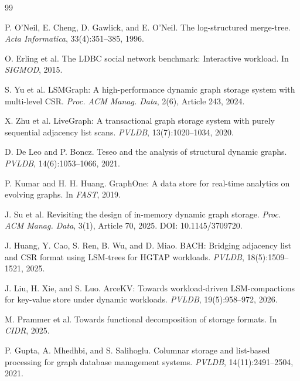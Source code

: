\documentclass[sigconf,screen]{cidr-2027}
\begin{document}
\begin{thebibliography}{99}

P. O'Neil, E. Cheng, D. Gawlick, and E. O'Neil.
\newblock The log-structured merge-tree.
\newblock \emph{Acta Informatica}, 33(4):351--385, 1996.

O. Erling et al.
\newblock The LDBC social network benchmark: Interactive workload.
\newblock In \emph{SIGMOD}, 2015.

S. Yu et al.
\newblock LSMGraph: A high-performance dynamic graph storage system with
multi-level CSR.
\newblock \emph{Proc. ACM Manag. Data}, 2(6), Article 243, 2024.

X. Zhu et al.
\newblock LiveGraph: A transactional graph storage system with purely
sequential adjacency list scans.
\newblock \emph{PVLDB}, 13(7):1020--1034, 2020.

D. De Leo and P. Boncz.
\newblock Teseo and the analysis of structural dynamic graphs.
\newblock \emph{PVLDB}, 14(6):1053--1066, 2021.

P. Kumar and H. H. Huang.
\newblock GraphOne: A data store for real-time analytics on evolving graphs.
\newblock In \emph{FAST}, 2019.

J. Su et al.
\newblock Revisiting the design of in-memory dynamic graph storage.
\newblock \emph{Proc. ACM Manag. Data}, 3(1), Article 70, 2025.
\newblock DOI: 10.1145/3709720.

J. Huang, Y. Cao, S. Ren, B. Wu, and D. Miao.
\newblock BACH: Bridging adjacency list and CSR format using LSM-trees for
HGTAP workloads.
\newblock \emph{PVLDB}, 18(5):1509--1521, 2025.

J. Liu, H. Xie, and S. Luo.
\newblock ArceKV: Towards workload-driven LSM-compactions for key-value store
under dynamic workloads.
\newblock \emph{PVLDB}, 19(5):958--972, 2026.

M. Prammer et al.
\newblock Towards functional decomposition of storage formats.
\newblock In \emph{CIDR}, 2025.

P. Gupta, A. Mhedhbi, and S. Salihoglu.
\newblock Columnar storage and list-based processing for graph database
management systems.
\newblock \emph{PVLDB}, 14(11):2491--2504, 2021.

\end{thebibliography}
\end{document}
